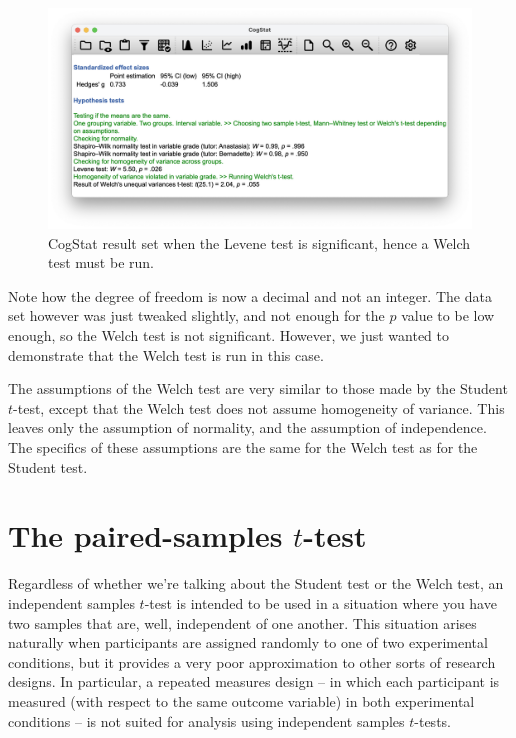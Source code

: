 \documentclass[
  11pt,
  a4paper,
  twoside,symmetric,openright]{book}
\theoremstyle{break}
\theoremstyle{break}
\begin{document}
\begin{figure}

{\centering \includegraphics[width=0.6\linewidth]{resources/image/cogstatharpowelch} 

}

\caption{CogStat result set when the Levene test is significant, hence a Welch test must be run.}\label{fig:harpowelch}
\end{figure}

Note how the degree of freedom is now a decimal and not an integer. The data set however was just tweaked slightly, and not enough for the \(p\) value to be low enough, so the Welch test is not significant. However, we just wanted to demonstrate that the Welch test is run in this case.

The assumptions of the Welch test are very similar to those made by the Student \(t\)-test, except that the Welch test does not assume homogeneity of variance. This leaves only the assumption of normality, and the assumption of independence. The specifics of these assumptions are the same for the Welch test as for the Student test.

\section{\texorpdfstring{The paired-samples \(t\)-test}{The paired-samples t-test}}\label{pairedsamplesttest}

Regardless of whether we're talking about the Student test or the Welch test, an independent samples \(t\)-test is intended to be used in a situation where you have two samples that are, well, independent of one another. This situation arises naturally when participants are assigned randomly to one of two experimental conditions, but it provides a very poor approximation to other sorts of research designs. In particular, a repeated measures design -- in which each participant is measured (with respect to the same outcome variable) in both experimental conditions -- is not suited for analysis using independent samples \(t\)-tests.
\end{document}
